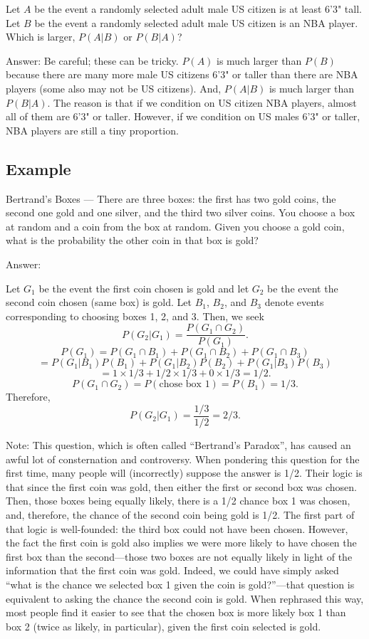 \documentclass[]{book}
\begin{document}
Let \(A\) be the event a randomly selected adult male US citizen is at
least 6'3" tall. Let \(B\) be the event a randomly selected adult male
US citizen is an NBA player. Which is larger, \(P(A|B)\) or \(P(B|A)\)?

Answer: Be careful; these can be tricky. \(P(A)\) is much larger than
\(P(B)\) because there are many more male US citizens 6'3" or taller
than there are NBA players (some also may not be US citizens). And,
\(P(A|B)\) is much larger than \(P(B|A)\). The reason is that if we
condition on US citizen NBA players, almost all of them are 6'3" or
taller. However, if we condition on US males 6'3" or taller, NBA players
are still a tiny proportion.

\subsection{Example}\label{example-2}

Bertrand's Boxes --- There are three boxes: the first has two gold
coins, the second one gold and one silver, and the third two silver
coins. You choose a box at random and a coin from the box at random.
Given you choose a gold coin, what is the probability the other coin in
that box is gold?

Answer:

Let \(G_1\) be the event the first coin chosen is gold and let \(G_2\)
be the event the second coin chosen (same box) is gold. Let \(B_1\),
\(B_2\), and \(B_3\) denote events corresponding to choosing boxes 1, 2,
and 3. Then, we seek \[P(G_2|G_1) = \frac{P(G_1\cap G_2)}{P(G_1)}.\]
\[P(G_1) = P(G_1 \cap B_1) + P(G_1 \cap B_2) + P(G_1 \cap B_3)\]
\[ = P(G_1 | B_1)P(B_1) + P(G_1 | B_2)P(B_2)+ P(G_1 | B_3)P(B_3)\]
\[ = 1 \times 1/3 + 1/2 \times 1/3 + 0 \times 1 /3 = 1/2.\]
\[P(G_1\cap G_2) = P(\text{chose box 1}) = P(B_1) = 1/3.\] Therefore,
\[P(G_2|G_1) = \frac{1/3}{1/2} = 2/3.\]

Note: This question, which is often called ``Bertrand's Paradox'', has
caused an awful lot of consternation and controversy. When pondering
this question for the first time, many people will (incorrectly) suppose
the answer is 1/2. Their logic is that since the first coin was gold,
then either the first or second box was chosen. Then, those boxes being
equally likely, there is a 1/2 chance box 1 was chosen, and, therefore,
the chance of the second coin being gold is 1/2. The first part of that
logic is well-founded: the third box could not have been chosen.
However, the fact the first coin is gold also implies we were more
likely to have chosen the first box than the second---those two boxes
are not equally likely in light of the information that the first coin
was gold. Indeed, we could have simply asked ``what is the chance we
selected box 1 given the coin is gold?''---that question is equivalent
to asking the chance the second coin is gold. When rephrased this way,
most people find it easier to see that the chosen box is more likely box
1 than box 2 (twice as likely, in particular), given the first coin
selected is gold.
\end{document}
